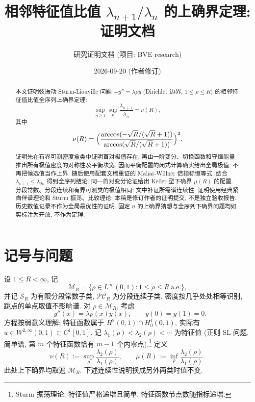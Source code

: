 \documentclass[UTF8]{ctexart}
\title{相邻特征值比值 \texorpdfstring{$\lambda_{n+1}/\lambda_n$}{lambda_{n+1}/lambda_n} 的上确界定理: 证明文档}
\author{研究证明文档 (项目: BVE research)}
\date{2026-09-20 (作者修订)}
\begin{document}
\maketitle

\begin{abstract}
本文证明弦振动 Sturm-Liouville 问题 $-y'' = \lambda\rho y$ (Dirichlet 边界,
$1 \leq \rho \leq R$) 的相邻特征值比值全序列上确界定理:
\[
	\sup_{n\geq 1}\sup_{\rho} \frac{\lambda_{n+1}}{\lambda_n} = \nu(R),
\]
其中
\[
	\nu(R) = \Bigl( \frac{\arccos(-\sqrt{R}/(\sqrt{R}+1))}{\arccos(\sqrt{R}/(\sqrt{R}+1))} \Bigr)^2 .
\]
证明先在有界可测密度盒类中证明首对极值存在, 再由一阶变分、切换函数和守恒能量
推出所有极值密度的对称性及平衡块宽. 因而平衡配置的闭式计算确实给出全局极值,
不再把候选值当作上界. 随后使用配套文稿重证的 Mahar-Willner 倍指标恒等式,
结合 $\lambda_{n+1}\leq\lambda_{2n}$ 得到全序列结论.
同一首对变分论证给出 Keller 型下确界 $\mu(R)$ 的配置.
分段常数、分段连续和有界可测类的极值相同; 文中补证所需谱连续性.
证明使用经典紧自伴谱理论和 Sturm 振荡、比较理论; 本稿是修订作者的证明提交,
不是独立验收报告. 历史数值记录不作为全局最优性的证明.
固定 $n$ 的上确界猜想与全序列下确界问题均如实标注为开放, 不作为定理.
\end{abstract}

\tableofcontents

\section{记号与问题}

设 $1\leq R<\infty$, 记
\[
 \mathcal M_R=\{\rho\in L^\infty(0,1):1\leq\rho\leq R\ \text{a.e.}\},
\]
并记 $\mathcal S_R$ 为有限分段常数子类, $\mathcal{PC}_R$ 为分段连续子类.
密度按几乎处处相等识别, 跳点的单点取值不影响谱. 对 $\rho\in\mathcal M_R$, 考虑
\begin{equation}
	-y''(x) = \lambda \rho(x) y(x), \qquad y(0) = y(1) = 0 .
\end{equation}
方程按弱意义理解; 特征函数属于 $H^2(0,1)\cap H^1_0(0,1)$,
实际有 $u\in W^{2,\infty}(0,1)\subset C^1[0,1]$.
记 $\lambda_1(\rho) < \lambda_2(\rho) < \cdots$ 为特征值
(正则 SL 问题, 简单谱, 第 $m$ 个特征函数恰有 $m-1$ 个内零点).\footnote{Sturm 振荡理论: 特征值严格递增且简单, 特征函数节点数随指标递增.}
定义
\begin{equation}
	\nu(R) := \sup_{\rho} \frac{\lambda_2(\rho)}{\lambda_1(\rho)},
	\qquad
	\mu(R) := \inf_{\rho} \frac{\lambda_2(\rho)}{\lambda_1(\rho)} .
\end{equation}
此处上下确界均取遍 $\mathcal M_R$. 下述连续性说明换成另外两类时值不变.
\end{document}
